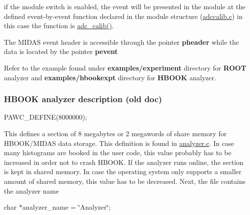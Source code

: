 \begin{DoxyItemize}
\begin{DoxyEnumerate}
\begin{DoxyItemize}
\item if the module switch is enabled, the event will be presented in the module at the defined event-\/by-\/event function declared in the module structure (\hyperlink{adccalib_8c}{adccalib.c}) in this case the function is \hyperlink{adccalib_8c_a21e1931a7c367947aeec0daa9548b6e7}{adc\_\-calib()}.
\item The MIDAS event header is accessible through the pointer {\bfseries pheader} while the data is located by the pointer {\bfseries pevent} 
\begin{DoxyCode}
  INT adc_calib(EVENT_HEADER * pheader, void *pevent)
  {
   INT i;
   WORD *pdata;
   float *cadc;

   /* look for ADC0 bank, return if not present */
   if (!bk_locate(pevent, "ADC0", &pdata))
    return 1;
\end{DoxyCode}

\end{DoxyItemize}
\end{DoxyEnumerate}
\end{DoxyItemize}


\begin{DoxyItemize}
\item Refer to the example found under {\bfseries examples/experiment} directory for {\bfseries ROOT} analyzer and {\bfseries examples/hbookexpt} directory for {\bfseries HBOOK} analyzer.
\end{DoxyItemize}\hypertarget{DataAnalysis_HBOOK_analyzer}{}\subsubsection{HBOOK analyzer description (old doc)}\label{DataAnalysis_HBOOK_analyzer}
PAWC\_\-DEFINE(8000000);

This defines a section of 8 megabytes or 2 megawords of share memory for HBOOK/MIDAS data storage. This definition is found in \hyperlink{analyzer_8c}{analyzer.c}. In case many histograms are booked in the user code, this value probably has to be increased in order not to crash HBOOK. If the analyzer runs online, the section is kept in shared memory. In case the operating system only supports a smaller amount of shared memory, this value has to be decreased. Next, the file contains the analyzer name

char $\ast$analyzer\_\-name = \char`\"{}Analyzer\char`\"{};

